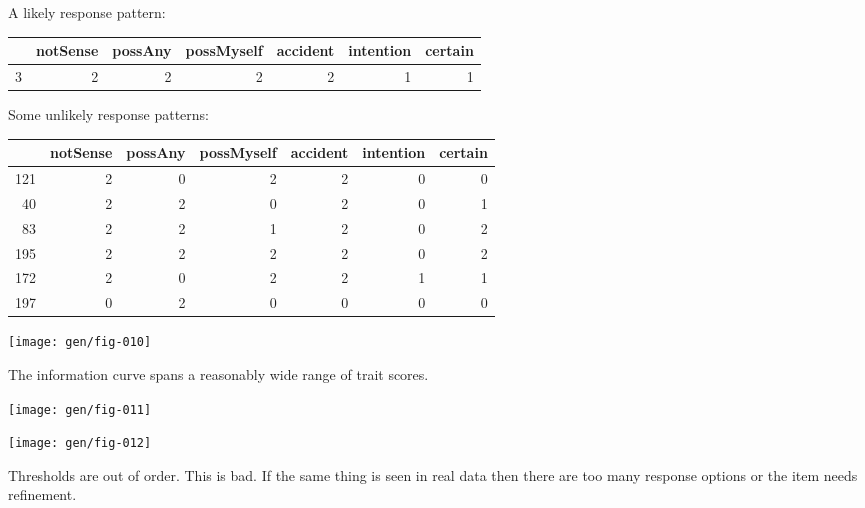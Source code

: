 \documentclass[10pt,utf8x]{beamer}
\begin{document}
\begin{frame}
A likely response pattern:
\begin{table}[ht]
\begin{center}
\begin{tabular}{rrrrrrr}
  \hline
 & notSense & possAny & possMyself & accident & intention & certain \\ 
  \hline
3 &   2 &   2 &   2 &   2 &   1 &   1 \\ 
   \hline
\end{tabular}
\end{center}
\end{table}
Some unlikely response patterns:
\begin{table}[ht]
\begin{center}
\begin{tabular}{rrrrrrr}
  \hline
 & notSense & possAny & possMyself & accident & intention & certain \\ 
  \hline
121 &   2 &   0 &   2 &   2 &   0 &   0 \\ 
  40 &   2 &   2 &   0 &   2 &   0 &   1 \\ 
  83 &   2 &   2 &   1 &   2 &   0 &   2 \\ 
  195 &   2 &   2 &   2 &   2 &   0 &   2 \\ 
  172 &   2 &   0 &   2 &   2 &   1 &   1 \\ 
  197 &   0 &   2 &   0 &   0 &   0 &   0 \\ 
   \hline
\end{tabular}
\end{center}
\end{table}\end{frame}

\begin{frame}
\texttt{[image: gen/fig-010]}

The information curve spans a reasonably wide range of trait scores.
\end{frame}

\begin{frame}
\texttt{[image: gen/fig-011]}
\end{frame}

\begin{frame}
\texttt{[image: gen/fig-012]}

Thresholds are out of order. This is bad. If the same thing is
seen in real data then there are too many response options or
the item needs refinement.
\end{frame}
\end{document}
